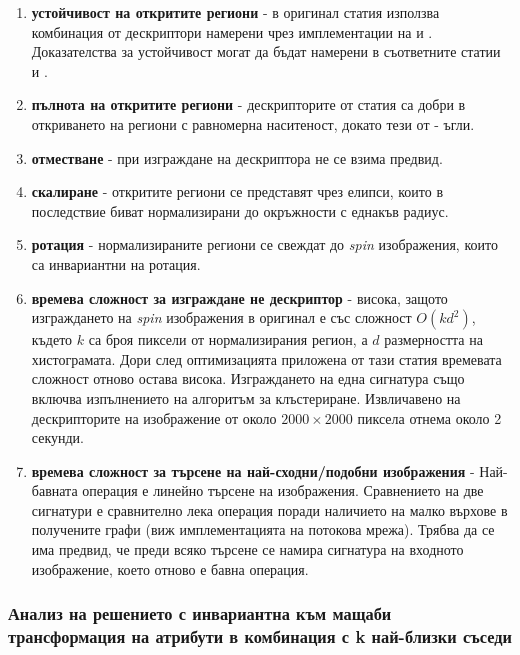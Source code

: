 \documentclass[a4paper,12pt]{article}
\begin{document}
\begin{enumerate}
    \item \textbf{устойчивост на откритите региони} - в оригинал статия \cite{spinimages} използва комбинация от дескриптори намерени чрез имплементации на \cite{shapeadaptedsmoothingfor3dcues} и \cite{affineinvariantipdetector}. Доказателства за устойчивост могат да бъдат намерени в съответните статии \cite{shapeadaptedsmoothingfor3dcues} и \cite{affineinvariantipdetector}.
    \item \textbf{пълнота на откритите региони} - дескрипторите от статия \cite{shapeadaptedsmoothingfor3dcues} са добри в откриването на региони с равномерна наситеност, докато тези от \cite{affineinvariantipdetector} - ъгли.
    \item \textbf{отместване} - при изграждане на дескриптора не се взима предвид.
    \item \textbf{скалиране} - откритите региони се представят чрез елипси, които в последствие биват нормализирани до окръжности с еднакъв радиус.
    \item \textbf{ротация} - нормализираните региони се свеждат до \textit{spin} изображения, които са инвариантни на ротация.
    \item \textbf{времева сложност за изграждане не дескриптор} - висока, защото изграждането на \textit{spin} изображения в оригинал е със сложност $O(k d^2)$, където $k$ са броя пиксели от нормализирания регион, а $d$ размерността на хистограмата. Дори след оптимизацията приложена от тази статия времевата сложност отново остава висока. Изграждането на една сигнатура също включва изпълнението на алгоритъм за клъстериране. Извличавено на дескрипторите на изображение от около $2000 \times 2000$ пиксела отнема около 2 секунди.
    \item \textbf{времева сложност за търсене на най-сходни/подобни изображения} - Най-бавната операция е линейно търсене на изображения. Сравнението на две сигнатури е сравнително лека операция поради наличието на малко върхове в получените графи (виж имплементацията на потокова мрежа). Трябва да се има предвид, че преди всяко търсене се намира сигнатура на входното изображение, което отново е бавна операция.
\end{enumerate}

\subsubsection{Анализ на решението с инвариантна към мащаби трансформация на атрибути в комбинация с k най-близки съседи}
\end{document}

